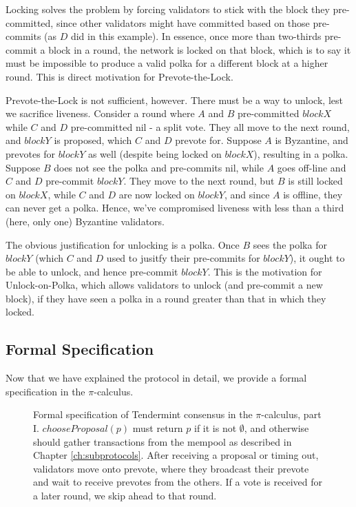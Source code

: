 Locking solves the problem by forcing validators to stick with the block they pre-committed, 
since other validators might have committed based on those pre-commits (as $D$ did in this example).
In essence, once more than two-thirds pre-commit a block in a round, the network is locked on that block,
which is to say it must be impossible to produce a valid polka for a different block at a higher round.
This is direct motivation for Prevote-the-Lock.

Prevote-the-Lock is not sufficient, however. 
There must be a way to unlock, lest we sacrifice liveness.
Consider a round where $A$ and $B$ pre-committed $blockX$ while $C$ and $D$ pre-committed nil - a split vote.
They all move to the next round, and $blockY$ is proposed, which $C$ and $D$ prevote for.
Suppose $A$ is Byzantine, and prevotes for $blockY$ as well (despite being locked on $blockX$), resulting in a polka.
Suppose $B$ does not see the polka and pre-commits nil, while $A$ goes off-line and $C$ and $D$ pre-commit $blockY$. 
They move to the next round, but $B$ is still locked on $blockX$, while $C$ and $D$ are now locked on $blockY$, 
and since $A$ is offline, they can never get a polka. 
Hence, we've compromised liveness with less than a third (here, only one) Byzantine validators.

The obvious justification for unlocking is a polka. 
Once $B$ sees the polka for $blockY$ (which $C$ and $D$ used to jusitfy their pre-commits for $blockY$), 
it ought to be able to unlock, and hence pre-commit $blockY$.
This is the motivation for Unlock-on-Polka, 
which allows validators to unlock (and pre-commit a new block),
if they have seen a polka in a round greater than that in which they locked.

\subsection{Formal Specification}

Now that we have explained the protocol in detail, 
we provide a formal specification in the $\pi$-calculus.

\begin{figure}[]
	\vspace*{-1cm}
    	\centering
	
	\caption[Formal specification of Tendermint consensus in the $\pi$-calculus, part I]{Formal specification of Tendermint consensus in the $\pi$-calculus, part I.
$chooseProposal(p)$ must return $p$ if it is not $\emptyset$, and otherwise should gather transactions from the mempool as described in Chapter \ref{ch:subprotocols}. 
After receiving a proposal or timing out, validators move onto prevote,
where they broadcast their prevote and wait to receive prevotes from the others.
If a vote is received for a later round, we skip ahead to that round.
 }
	\label{fig:tendermint_pi1}
\end{figure}

